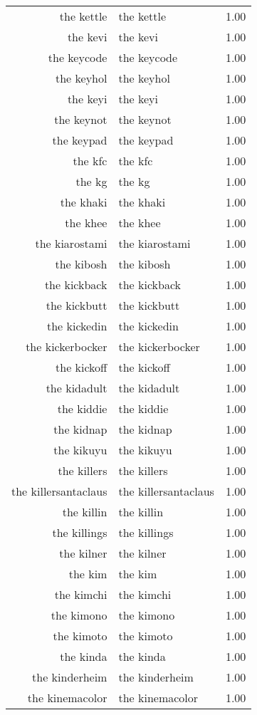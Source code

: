 \begin{table}[ht]
\begin{tabular}{rlr}
  the kettle & the kettle & 1.00 \\ 
  the kevi & the kevi & 1.00 \\ 
  the keycode & the keycode & 1.00 \\ 
  the keyhol & the keyhol & 1.00 \\ 
  the keyi & the keyi & 1.00 \\ 
  the keynot & the keynot & 1.00 \\ 
  the keypad & the keypad & 1.00 \\ 
  the kfc & the kfc & 1.00 \\ 
  the kg & the kg & 1.00 \\ 
  the khaki & the khaki & 1.00 \\ 
  the khee & the khee & 1.00 \\ 
  the kiarostami & the kiarostami & 1.00 \\ 
  the kibosh & the kibosh & 1.00 \\ 
  the kickback & the kickback & 1.00 \\ 
  the kickbutt & the kickbutt & 1.00 \\ 
  the kickedin & the kickedin & 1.00 \\ 
  the kickerbocker & the kickerbocker & 1.00 \\ 
  the kickoff & the kickoff & 1.00 \\ 
  the kidadult & the kidadult & 1.00 \\ 
  the kiddie & the kiddie & 1.00 \\ 
  the kidnap & the kidnap & 1.00 \\ 
  the kikuyu & the kikuyu & 1.00 \\ 
  the killers & the killers & 1.00 \\ 
  the killersantaclaus & the killersantaclaus & 1.00 \\ 
  the killin & the killin & 1.00 \\ 
  the killings & the killings & 1.00 \\ 
  the kilner & the kilner & 1.00 \\ 
  the kim & the kim & 1.00 \\ 
  the kimchi & the kimchi & 1.00 \\ 
  the kimono & the kimono & 1.00 \\ 
  the kimoto & the kimoto & 1.00 \\ 
  the kinda & the kinda & 1.00 \\ 
  the kinderheim & the kinderheim & 1.00 \\ 
  the kinemacolor & the kinemacolor & 1.00 \\ 

\end{tabular}
\end{table}
